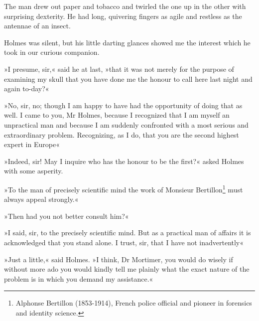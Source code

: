 The man drew out paper and tobacco and twirled the one up in the other with surprising dexterity. He had long, quivering fingers as agile and restless as the antennae of an insect.

Holmes was silent, but his little darting glances showed me the interest which he took in our curious companion.

»I presume, sir,« said he at last, »that it was not merely for the purpose of examining my skull that you have done me the honour to call here last night and again to-day?«

»No, sir, no; though I am happy to have had the opportunity of doing that as well. I came to you, Mr Holmes, because I recognized that I am myself an unpractical man and because I am suddenly confronted with a most serious and extraordinary problem. Recognizing, as I do, that you are the second highest expert in Europe\longdash«

»Indeed, sir! May I inquire who has the honour to be the first?« asked Holmes with some asperity.

»To the man of precisely scientific mind the work of Monsieur Bertillon\footnote{Alphonse Bertillon (1853-1914), French police official and pioneer in forensics and identity science.} must always appeal strongly.«

»Then had you not better consult him?«

»I said, sir, to the precisely scientific mind. But as a practical man of affairs it is acknowledged that you stand alone. I trust, sir, that I have not inadvertently\longdash«

»Just a little,« said Holmes. »I think, Dr Mortimer, you would do wisely if without more ado you would kindly tell me plainly what the exact nature of the problem is in which you demand my assistance.«
